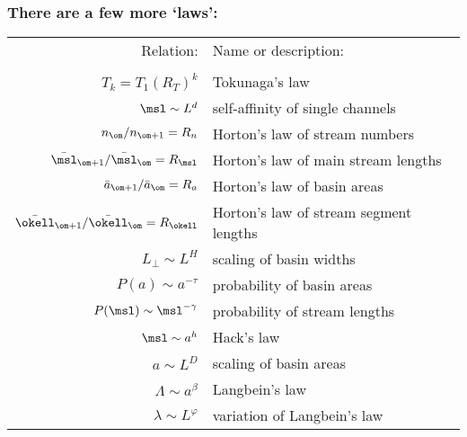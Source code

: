 \begin{frame}[label=]
  \frametitle{There are a few more `laws':\cite{dodds1999a}}

  \begin{tabular}{rl}
    \alert{Relation:} & \alert{Name or description:}  \\
    & \\
    $T_{k} = T_1 (R_T)^{k}$ & {Tokunaga's law}  \\
    $\msl \sim L^{{d}}$ & {self-affinity of single channels}  \\
    $n_{\om}/n_{\om+1} = R_n$ & Horton's law of stream numbers  \\
    $\bar{\msl}_{\om+1}/\bar{\msl}_{\om} = R_{\msl}$ & Horton's law 
    of main stream lengths \\
    $\bar{a}_{\om+1}/\bar{a}_{\om} = R_a$ & Horton's law of basin areas \\
    $\bar{\okell}_{\om+1}/\bar{\okell}_{\om} = R_{\okell}$ & Horton's law 
    of stream segment lengths  \\
    $L_\perp \sim L^H$ & scaling of basin widths \\
    $P(a) \sim a^{-\tau}$ & probability of basin areas \\
    $P(\msl)\sim \msl^{-\gamma}$ & probability of stream lengths \\
    $\msl \sim a^h$ & Hack's law \\
    $a \sim L^D$ & scaling of basin areas \\
    $\Lambda \sim a^\beta$ & Langbein's law \\
    $\lambda \sim L^\varphi$ & variation of Langbein's law\\
  \end{tabular}

\end{frame}

